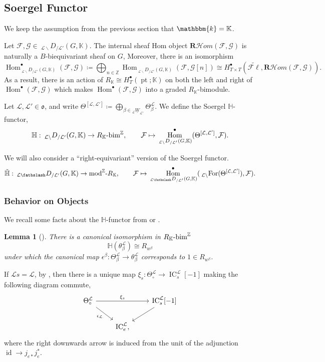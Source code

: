 \documentclass{amsart}
\newcommand{\Z}{\mathbb{Z}}
\newcommand{\K}{\mathbb{K}}
\renewcommand{\k}{\mathbbm{k}}
\renewcommand{\H}{\mathbb{H}}
\newcommand{\scrF}{\mathcal{F}}
\newcommand{\scrG}{\mathcal{G}}
\newcommand{\scrL}{\mathcal{L}}
\DeclareMathOperator{\Hom}{Hom}
\newcommand{\grrmod}[1]{\textnormal{mod}^{\Z}\textnormal{-}#1}
\newcommand{\grbim}[1]{#1\textnormal{-bim}^{\Z}}
\DeclareMathOperator{\IC}{IC}
\newcommand{\RHom}{\textbf{R}\mathcal{H}om}
\DeclareMathOperator{\pt}{pt}
\DeclareMathOperator{\id}{id}
\newcommand{\fr}[1]{\mathfrak{#1}}
\newcommand{\eFl}{\widetilde{\mathcal{F}\ell}}
\newcommand{\DME}[2]{\:_{#1 \smallleftdash} D_{/ #2} }
\newcommand{\DEE}[2]{\:_{#1 \backslash} D_{/ #2} }
\newcommand{\ForME}[1]{\:_{#1 \backslash} \textnormal{For}}
\newcommand{\uW}[2]{{}_{#1}\underline{W}_{#2}}
\newcommand{\bfslash}{\mathbin{\fatbslash}}
\newcommand*\smallleftdash{\bfslash}
\newtheorem{lemma}[subsubsection]{Lemma}
\theoremstyle{definition}
\numberwithin{equation}{subsection}
\begin{document}
\subsection{Soergel Functor}

We keep the assumption from the previous section that $\k = \K$.

Let $\scrF, \scrG \in \DEE{\scrL}{\scrL'} (G, \K)$. The internal sheaf Hom object $\RHom (\scrF, \scrG)$ is naturally a $B$-biequivariant sheaf on $G$,
Moreover, there is an isomorphism
\[\Hom_{\DEE{\scrL}{\scrL'} (G, \K)}^{\bullet} (\scrF, \scrG) \coloneq \bigoplus_{n \in \Z} \Hom_{\DEE{\scrL}{\scrL'} (G, \K)} (\scrF, \scrG [n]) \cong H_{T \times T}^{\bullet} (\eFl, \RHom (\scrF, \scrG)).\]
As a result, there is an action of $R_{\K} \cong H_T^{\bullet} (\pt; \K)$ on both the left and right of $\Hom^{\bullet} (\scrF, \scrG)$ which makes $\Hom^{\bullet} (\scrF, \scrG)$ into a graded $R_{\K}$-bimodule.

Let $\scrL, \scrL' \in \fr{o}$, and write $\Theta^{[\scrL, \scrL']} \coloneq \bigoplus_{\beta \in \uW{\scrL}{\scrL'}} \Theta^{\scrL}_{\beta}.$
We define the Soergel $\H$-functor,
\[\H : \DEE{\scrL}{\scrL'} (G, \K) \to \grbim{R_{\K}}, \qquad \scrF \mapsto \Hom_{\DEE{\scrL}{\scrL'} (G, \K)}^{\bullet} (\Theta^{[\scrL, \scrL']}, \scrF).\]

We will also consider a ``right-equivariant'' version of the Soergel functor. 
\[\tilde{\H} : \DME{\scrL}{\scrL'} (G, \K) \to \grrmod{R_{\K}}, \qquad \scrF \mapsto \Hom_{\DME{\scrL}{\scrL'} (G, \K)}^{\bullet} (\ForME{\scrL} (\Theta^{[\scrL, \scrL']}), \scrF).\] 

\subsubsection{Behavior on Objects}

We recall some facts about the $\H$-functor from \cite{LY} or \cite{Sandvik}.

\begin{lemma}[{\cite[Lemma 7.3]{LY}}]\label{lem:H_on_min_ICs}
    There is a canonical isomorphism in $\grbim{R_{\K}}$
    \[\H (\theta^{\scrL}_{\beta}) \cong R_{w^{\beta}}\]
    under which the canonical map $\epsilon^{\beta} : \Theta^{\scrL}_{\beta} \to \theta_{\beta}^{\scrL}$ corresponds to $1 \in R_{w^{\beta}}$.
\end{lemma}

If $\scrL s = \scrL$, by \cite[Lemma 4.5.6]{Sandvik}, then there is a unique map $\xi_s : \Theta^{\scrL}_{\circ} \to \IC_s^{\scrL} [-1]$ making the following diagram commute,
\begin{equation}\label{eq:char_of_theta_s}
    \begin{tikzcd}
        \Theta^{\scrL}_{\circ} \arrow[rr, "\xi_s"] \arrow[rd, "\epsilon_{\scrL}"'] &               & \IC_s^{\scrL} [-1] \arrow[ld] \\
                                                                              & \IC_e^{\scrL}, &                         
        \end{tikzcd}
\end{equation}
where the right downwards arrow is induced from the unit of the adjunction $\id \to j_{e*} j_e^*$.
\end{document}
